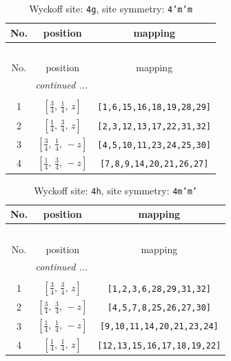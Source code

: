 \documentclass[fleqn,8pt]{jsarticle}
\begin{document}
\renewcommand{\arraystretch}{1.2}
\begin{longtable}{ccc}
\caption{Wyckoff site: {\tt 4g}, site symmetry: {\tt 4'm'm}}
 \\
 \hline \hline
No. & position & mapping \\ \hline \endfirsthead

\multicolumn{2}{l}{\tablename\ \thetable{}} \\
 \hline \hline
No. & position & mapping \\ \hline \endhead

 \hline \hline
\multicolumn{2}{r}{\footnotesize\it continued ...} \\ \endfoot

 \hline \hline
\multicolumn{2}{r}{} \\ \endlastfoot

1 & $\left[ \frac{3}{4},\, \frac{1}{4},\, z \right]$ & {\tt [1,6,15,16,18,19,28,29]} \\ \hline
2 & $\left[ \frac{1}{4},\, \frac{3}{4},\, z \right]$ & {\tt [2,3,12,13,17,22,31,32]} \\ \hline
3 & $\left[ \frac{3}{4},\, \frac{1}{4},\, - z \right]$ & {\tt [4,5,10,11,23,24,25,30]} \\ \hline
4 & $\left[ \frac{1}{4},\, \frac{3}{4},\, - z \right]$ & {\tt [7,8,9,14,20,21,26,27]} \\
\end{longtable}
\renewcommand{\arraystretch}{1.2}
\begin{longtable}{ccc}
\caption{Wyckoff site: {\tt 4h}, site symmetry: {\tt 4m'm'}}
 \\
 \hline \hline
No. & position & mapping \\ \hline \endfirsthead

\multicolumn{2}{l}{\tablename\ \thetable{}} \\
 \hline \hline
No. & position & mapping \\ \hline \endhead

 \hline \hline
\multicolumn{2}{r}{\footnotesize\it continued ...} \\ \endfoot

 \hline \hline
\multicolumn{2}{r}{} \\ \endlastfoot

1 & $\left[ \frac{3}{4},\, \frac{3}{4},\, z \right]$ & {\tt [1,2,3,6,28,29,31,32]} \\ \hline
2 & $\left[ \frac{3}{4},\, \frac{3}{4},\, - z \right]$ & {\tt [4,5,7,8,25,26,27,30]} \\ \hline
3 & $\left[ \frac{1}{4},\, \frac{1}{4},\, - z \right]$ & {\tt [9,10,11,14,20,21,23,24]} \\ \hline
4 & $\left[ \frac{1}{4},\, \frac{1}{4},\, z \right]$ & {\tt [12,13,15,16,17,18,19,22]} \\
\end{longtable}
\end{document}
